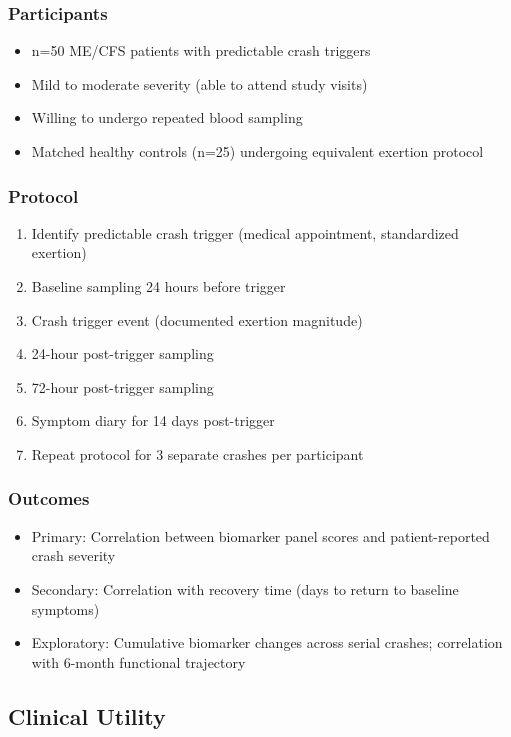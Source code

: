 \subsubsection{Participants}
\begin{itemize}
    \item n=50 ME/CFS patients with predictable crash triggers
    \item Mild to moderate severity (able to attend study visits)
    \item Willing to undergo repeated blood sampling
    \item Matched healthy controls (n=25) undergoing equivalent exertion protocol
\end{itemize}

\subsubsection{Protocol}
\begin{enumerate}
    \item Identify predictable crash trigger (medical appointment, standardized exertion)
    \item Baseline sampling 24 hours before trigger
    \item Crash trigger event (documented exertion magnitude)
    \item 24-hour post-trigger sampling
    \item 72-hour post-trigger sampling
    \item Symptom diary for 14 days post-trigger
    \item Repeat protocol for 3 separate crashes per participant
\end{enumerate}

\subsubsection{Outcomes}
\begin{itemize}
    \item Primary: Correlation between biomarker panel scores and patient-reported crash severity
    \item Secondary: Correlation with recovery time (days to return to baseline symptoms)
    \item Exploratory: Cumulative biomarker changes across serial crashes; correlation with 6-month functional trajectory
\end{itemize}

\subsection{Clinical Utility}

